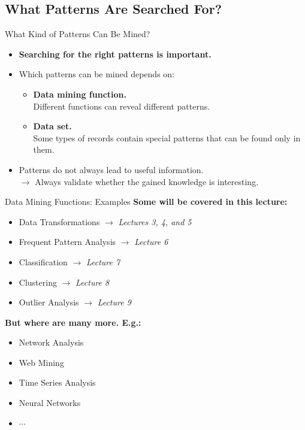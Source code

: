 \subsection{What Patterns Are Searched For?}

\begin{frame}{What Kind of Patterns Can Be Mined?}
	\begin{itemize}
		\item \textbf{Searching for the right patterns is important.}
		\item Which patterns can be mined depends on:
		      \begin{itemize}
			      \item \textbf{Data mining function.} \\
			            \small{Different functions can reveal different patterns.}
			      \item \textbf{Data set.} \\
			            \small{Some types of records contain special patterns that
				            can be found only in them.}
		      \end{itemize}
		\item Patterns do not always lead to useful information. \\
		      $\rightarrow$ Always validate whether the gained knowledge is
		      interesting.
	\end{itemize}
\end{frame}

\begin{frame}{Data Mining Functions: Examples}
	\textbf{Some will be covered in this lecture:}
	\begin{itemize}
		\item Data Transformations $\rightarrow$ \textit{Lectures 3, 4, and 5}
		\item Frequent Pattern Analysis $\rightarrow$ \textit{Lecture 6}
		\item Classification $\rightarrow$ \textit{Lecture 7}
		\item Clustering $\rightarrow$ \textit{Lecture 8}
		\item Outlier Analysis $\rightarrow$ \textit{Lecture 9}
	\end{itemize}

	\textbf{But where are many more. E.g.:}
	\begin{itemize}
		\item Network Analysis
		\item Web Mining
		\item Time Series Analysis
		\item Neural Networks
		\item $\cdots$
	\end{itemize}
\end{frame}
